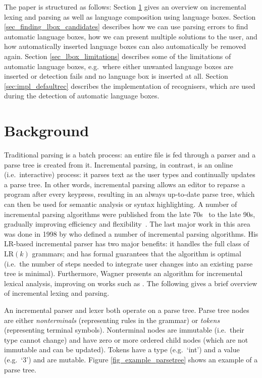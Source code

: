 \documentclass[sigplan,screen]{acmart}\settopmatter{printfolios=true,printccs=false,printacmref=false}
\begin{document}
The paper is structured as follows: Section \ref{sec_background} gives an
overview on incremental lexing and parsing as well as language composition
using language boxes. Section \ref{sec_finding_lbox_candidates}
describes how we can use parsing errors to find automatic language boxes, how
we can present multiple solutions to the user, and how automatically inserted
language boxes can also automatically be removed again. Section
\ref{sec_lbox_limitations} describes some of the limitations of automatic
language boxes, e.g.~where either unwanted language boxes are inserted or
detection fails and no language box is inserted at all. Section
\ref{sec:impl_defaultrec} describes the implementation of recognisers, which
are used during the detection of automatic language boxes.

\section{Background}
\label{sec_background}

Traditional parsing is a batch process: an entire file is fed through a parser
and a parse tree is created from it. Incremental parsing, in contrast, is an
online (i.e.~interactive) process: it parses text as the user types and
continually updates a parse tree.  In other words, incremental parsing allows
an editor to reparse a program after every keypress, resulting in an always
up-to-date parse tree, which can then be used for semantic analysis or syntax
highlighting.  A number of incremental parsing algorithms were published from
the late 70s~\cite{ghezzi79incremental, jalili82building, larcheveque95optimal,
petrone95reusing} to the late 90s, gradually improving efficiency and
flexibility~\cite{li97new,ferro94efficient}.  The last major work in this area
was done in 1998 by \cite{wagner98practicalalgorithms} who defined a number of
incremental parsing algorithms. His LR-based incremental parser has two major
benefits: it handles the full class of $\textrm{LR}(k)$ grammars; and has
formal guarantees that the algorithm is optimal (i.e.~the number of steps
needed to integrate user changes into an existing parse tree is minimal).
Furthermore, Wagner presents an algorithm for incremental lexical analysis,
improving on works such as \cite{fischer84poe, bahlke86psg, ballance92pan,
fischer92aladin}. The following gives a brief overview of incremental lexing
and parsing.

An incremental parser and lexer both operate on a parse tree. Parse tree nodes
are either \emph{nonterminals} (representing rules in the grammar) or
\emph{tokens} (representing terminal symbols). Nonterminal nodes are immutable
(i.e.~their type cannot change) and have zero or more ordered child nodes
(which are not immutable and can be updated). Tokens have a type (e.g.~`int')
and a value (e.g.~`3') and are mutable. Figure \ref{fig_example_parsetree}
shows an example of a parse tree.
\end{document}
